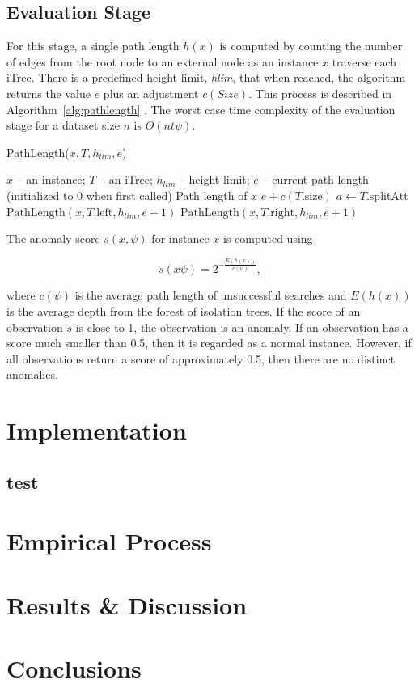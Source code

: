 \documentclass[10pt, conference]{IEEEtran}
\begin{document}
\subsection{Evaluation Stage}
For this stage, a single path length $h(x)$ is computed by counting the number of edges from the root node to an external node as an instance $x$ traverse each iTree. There is a predefined height limit, \textit{hlim}, that when reached, the algorithm returns the value $e$ plus an adjustment $c(Size)$. This process is described in Algorithm~\ref{alg:pathlength} \cite{iforest2}. The worst case time complexity of the evaluation stage for a dataset size $n$ is $O(nt \psi)$.

\begin{algorithm}[H]
	\caption{PathLength($x, T, h_{lim}, e$)}
	\label{alg:pathlength}
	\begin{algorithmic}[1]
		\Require $x$ -- an instance; $T$ -- an iTree; $h_{lim}$ -- height limit; $e$ -- current path length (initialized to 0 when first called)
		\Ensure Path length of $x$
		\State \Return $e + c(T.\text{size})$ 
		\Else
		\State $a \gets T.\text{splitAtt}$
		\State \Return $\text{PathLength}(x, T.\text{left}, h_{lim}, e + 1)$
		\Else
		\State \Return $\text{PathLength}(x, T.\text{right}, h_{lim}, e + 1)$
		\EndIf
		\EndIf
	\end{algorithmic}
\end{algorithm}

The anomaly score $s(x, \psi)$ for instance $x$ is computed using

\begin{equation}
	s(x \psi) = 2^{- \frac{E(h(x))}{c(\psi)}},
\end{equation}

where $c(\psi)$ is the average path length of unsuccessful searches and $E(h(x))$ is the average depth from the forest of isolation trees. If the score of an observation $s$ is close to 1, the observation is an anomaly. If an observation has a score much smaller than 0.5, then it is regarded as a normal instance. However, if all observations return a score of approximately 0.5, then there are no distinct anomalies.


\section{Implementation}
\subsection{test}

\section{Empirical Process}



\section{Results \& Discussion}



\section{Conclusions}




\end{document}
